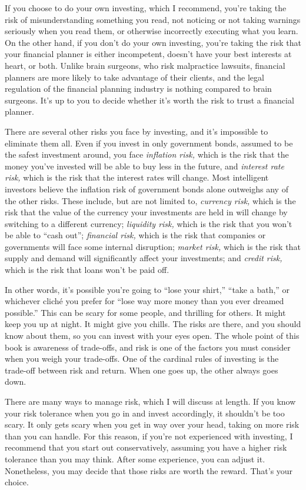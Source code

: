 If you choose to do your own investing, which I recommend, you're taking the risk of misunderstanding something you read, not noticing or not taking warnings seriously when you read them, or otherwise incorrectly executing what you learn. On the other hand, if you don't do your own investing, you're taking the risk that your financial planner is either incompetent, doesn't have your best interests at heart, or both. Unlike brain surgeons, who risk malpractice lawsuits, financial planners are more likely to take advantage of their clients, and the legal regulation of the financial planning industry is nothing compared to brain surgeons. It's up to you to decide whether it's worth the risk to trust a financial planner.

There are several other risks you face by investing, and it's impossible to eliminate them all. Even if you invest in only government bonds, assumed to be the safest investment around, you face \emph{inflation risk,} which is the risk that the money you've invested will be able to buy less in the future, and \emph{interest rate risk,} which is the risk that the interest rates will change. Most intelligent investors believe the inflation risk of government bonds alone outweighs any of the other risks. These include, but are not limited to, \emph{currency risk,} which is the risk that the value of the currency your investments are held in will change by switching to a different currency; \emph{liquidity risk,} which is the risk that you won't be able to “cash out”; \emph{financial risk,} which is the risk that companies or governments will face some internal disruption; \emph{market risk,} which is the risk that supply and demand will significantly affect your investments; and \emph{credit risk,} which is the risk that loans won't be paid off.

In other words, it's possible you're going to ``lose your shirt,'' ``take a bath,'' or whichever cliché you prefer for ``lose way more money than you ever dreamed possible.'' This can be scary for some people, and thrilling for others. It might keep you up at night. It might give you chills. The risks are there, and you should know about them, so you can invest with your eyes open. The whole point of this book is awareness of trade-offs, and risk is one of the factors you must consider when you weigh your trade-offs. One of the cardinal rules of investing is the trade-off between risk and return. When one goes up, the other always goes down.

There are many ways to manage risk, which I will discuss at length. If you know your risk tolerance when you go in and invest accordingly, it shouldn't be too scary. It only gets scary when you get in way over your head, taking on more risk than you can handle. For this reason, if you're not experienced with investing, I recommend that you start out conservatively, assuming you have a higher risk tolerance than you may think. After some experience, you can adjust it. Nonetheless, you may decide that those risks are worth the reward. That's your choice.

